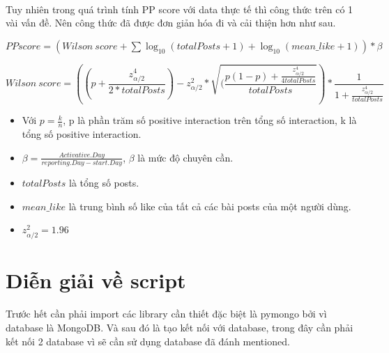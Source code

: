 \documentclass[12pt]{article}
\numberwithin{equation}{section}
\begin{document}
\paragraph{} Tuy nhiên trong quá trình tính PP score với data thực tế thì công thức trên có 1 vài vấn đề. Nên công thức đã được đơn giản hóa đi và cải thiện hơn như sau.

$
PP score = ( Wilson\ score + \sum \log_{10}(totalPosts+1) + \log_{10}(mean\_like+1))*\beta
$

\begin{equation}
Wilson\ score = ((p + \frac{z^4_{\alpha/2}}{2*totalPosts})  - z^2_{\alpha/2}*\sqrt{(\frac{p(1-p)+\frac{z^4_{\alpha/2}}{4totalPosts}}{totalPosts} }) * \frac{1}{1 + \frac{z^4_{\alpha/2}}{totalPosts}}
\end{equation}

\begin{itemize}
\item Với $p=\frac{k}{n}$, p là phần trăm số positive interaction trên tổng số interaction, k là tổng số positive interaction.
\item $\beta = \frac{Activative.Day}{reporting.Day - start.Day}$, $\beta$ là mức độ chuyên cần.
\item $totalPosts$ là tổng số posts.
\item $mean\_like$ là trung bình số like của tất cả các bài posts của một người dùng.
\item $z^2_{\alpha/2} = 1.96$
\end{itemize}



\section{Diễn giải về script}

\paragraph{} Trước hết cần phải import các library cần thiết đặc biệt là pymongo bởi vì database là MongoDB. Và sau đó là tạo kết nối với database, trong đây cần phải kết nối 2 database vì sẽ cần sử dụng database đã đánh mentioned.
\end{document}
